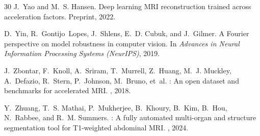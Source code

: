 \documentclass[10pt,twocolumn,letterpaper]{article}
\begin{document}
\begin{thebibliography}{30}
J.~Yao and M.~S. Hansen.
\newblock Deep learning {MRI} reconstruction trained across acceleration factors.
\newblock Preprint, 2022.

D.~Yin, R.~Gontijo~Lopes, J.~Shlens, E.~D. Cubuk, and J.~Gilmer.
\newblock A {Fourier} perspective on model robustness in computer vision.
\newblock In {\em Advances in Neural Information Processing Systems (NeurIPS)}, 2019.

J.~Zbontar, F.~Knoll, A.~Sriram, T.~Murrell, Z.~Huang, M.~J. Muckley, A.~Defazio, R.~Stern, P.~Johnson, M.~Bruno, et~al.
: An open dataset and benchmarks for accelerated {MRI}.
, 2018.

Y.~Zhuang, T.~S. Mathai, P.~Mukherjee, B.~Khoury, B.~Kim, B.~Hou, N.~Rabbee, and R.~M. Summers.
: A fully automated multi-organ and structure segmentation tool for {T1}-weighted abdominal {MRI}.
, 2024.

\end{thebibliography}
\end{document}
